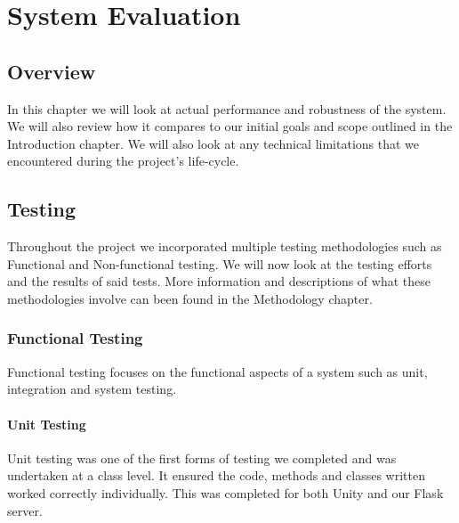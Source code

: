 \chapter{System Evaluation}
\section{Overview}
In this chapter we will look at actual performance and robustness of the system. We will also review how it compares to our initial goals and scope outlined in the Introduction chapter. We will also look at any technical limitations that we encountered during the project's life-cycle.

\section{Testing}
Throughout the project we incorporated multiple testing methodologies such as Functional and Non-functional testing. We will now look at the testing efforts and the results of said tests. More information and descriptions of what these methodologies involve can been found in the Methodology chapter.

\subsection{Functional Testing}
Functional testing focuses on the functional aspects of a system such as unit, integration and system testing.

\subsubsection{Unit Testing}
Unit testing was one of the first forms of testing we completed and was undertaken at a class level. It ensured the code, methods and classes written worked correctly individually. This was completed for both Unity and our Flask server.

